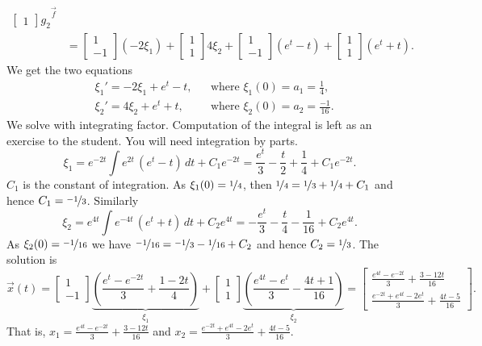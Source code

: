 \begin{example}
\begin{equation*}
\begin{split}
{\begin{bmatrix}
1
\end{bmatrix} g_2
}^{\vec{f}}
\\
& =
\begin{bmatrix}
1 \\
-1
\end{bmatrix} (-2\xi_1) +
\begin{bmatrix}
1 \\
1
\end{bmatrix} 4\xi_2
+
\begin{bmatrix}
1 \\
-1
\end{bmatrix} (e^t - t)
+
\begin{bmatrix}
1 \\
1
\end{bmatrix} (e^t + t) .
\end{split}
\end{equation*}
We get the two equations
\begin{align*}
& \xi_1' = -2\xi_1 + e^t -t, & & \text{where } \xi_1(0) = a_1 = \frac{1}{4} , \\
& \xi_2' = 4\xi_2 + e^t + t, & & \text{where } \xi_2(0) = a_2 = \frac{-1}{16} .
\end{align*}
We solve with integrating factor.  Computation of the integral is left as
an exercise to the student.  You will need integration by parts.
\begin{equation*}
\xi_1 = e^{-2t}\int e^{2t} \, (e^t-t) \, dt + C_1 e^{-2t} = 
\frac{e^t}{3}-\frac{t}{2}+\frac{1}{4}+C_1 e^{-2t} .
\end{equation*}
$C_1$ is the constant of integration.
As $\xi_1(0) = \nicefrac{1}{4}$, then $\nicefrac{1}{4}= \nicefrac{1}{3}
+ \nicefrac{1}{4} + C_1$ and hence
$C_1 = \nicefrac{-1}{3}$.
Similarly
\begin{equation*}
\xi_2 = e^{4t}\int e^{-4t} \, (e^t+ t) \, dt + C_2 e^{4t} = 
-\frac{e^t}{3}-\frac{t}{4}-\frac{1}{16} + C_2 e^{4t} .
\end{equation*}
As $\xi_2(0) = \nicefrac{-1}{16}$ we have $\nicefrac{-1}{16}= \nicefrac{-1}{3}
-\nicefrac{1}{16} + C_2$ and hence
$C_2 = \nicefrac{1}{3}$.
The solution is
\begin{equation*}
\vec{x}(t)=
\begin{bmatrix}
1 \\
-1
\end{bmatrix}
\underbrace{\left( \frac{e^t-e^{-2t}}{3}+\frac{1-2t}{4} \right)}%
_{\xi_1} +
\begin{bmatrix}
1 \\
1
\end{bmatrix}
\underbrace{\left( \frac{e^{4t}-e^t}{3}-\frac{4t+1}{16} \right)}%
_{\xi_2}
=
\begin{bmatrix}
\frac{e^{4t}-e^{-2t}}{3}+\frac{3-12t}{16} \\
\frac{e^{-2t}+e^{4t}-2e^t}{3}+\frac{4t-5}{16}
\end{bmatrix} .
\end{equation*}
That is,
$x_1 = \frac{e^{4t}-e^{-2t}}{3}+\frac{3-12t}{16}$
and
$x_2 = \frac{e^{-2t}+e^{4t}-2e^t}{3}+\frac{4t-5}{16}$.
\end{example}

